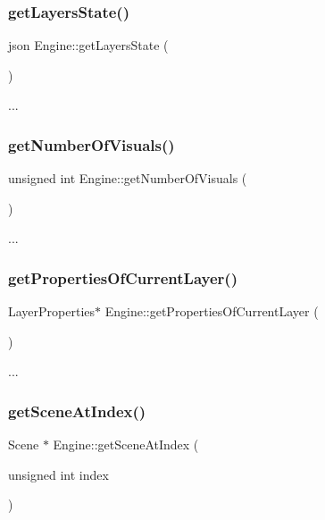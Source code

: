 \subsubsection{\texorpdfstring{get\+Layers\+State()}{getLayersState()}}
{\footnotesize\ttfamily json Engine\+::get\+Layers\+State (\begin{DoxyParamCaption}{ }\end{DoxyParamCaption})}

... \mbox{\label{class_engine_a02161314b59b98413587878fbe74bda0}} 
\subsubsection{\texorpdfstring{get\+Number\+Of\+Visuals()}{getNumberOfVisuals()}}
{\footnotesize\ttfamily unsigned int Engine\+::get\+Number\+Of\+Visuals (\begin{DoxyParamCaption}{ }\end{DoxyParamCaption})}

... \mbox{\label{class_engine_af1868ab55619c4eceb1dce26bd7a0182}} 
\subsubsection{\texorpdfstring{get\+Properties\+Of\+Current\+Layer()}{getPropertiesOfCurrentLayer()}}
{\footnotesize\ttfamily Layer\+Properties$\ast$ Engine\+::get\+Properties\+Of\+Current\+Layer (\begin{DoxyParamCaption}{ }\end{DoxyParamCaption})}

... \mbox{\label{class_engine_a161746a86c8a635a1552f6184a9381e6}} 
\subsubsection{\texorpdfstring{get\+Scene\+At\+Index()}{getSceneAtIndex()}}
{\footnotesize\ttfamily Scene $\ast$ Engine\+::get\+Scene\+At\+Index (\begin{DoxyParamCaption}\item[{unsigned int}]{index }\end{DoxyParamCaption})}

